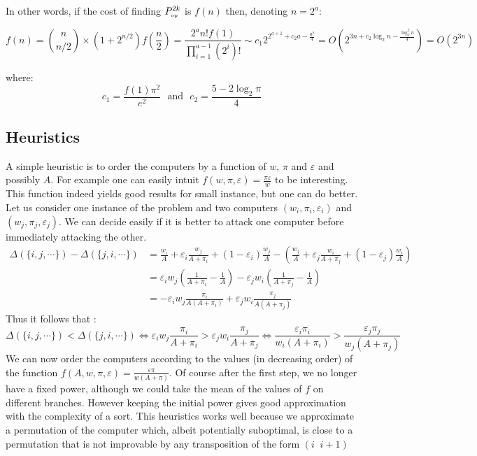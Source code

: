 \documentclass[11pt]{llncs}
\begin{document}
In other words, if the cost of finding $P_{\mbox{{\tiny op}}}^{2k}$ is $f(n)$ then, denoting $n=2^a$:

$$f(n)= \binom{n}{n/2} \times (1+2^{n/2}) f(\frac{n}2)
= \frac{2^a n! f(1)}{\prod_{i=1}^{a-1}(2^i)!} \sim c_1 2^{2^{a+1} + c_2 a - \frac{a^2}4}=
O(2^{3 n + c_2 \log_2 n- \frac{\log_2^2 n}4})=O(2^{3n})$$

where: $$c_1=\frac{f(1)\pi^2}{e^2}\mbox{~~and~~}c_2=\frac{5-2\log_2 \pi}4$$


	\subsection{Heuristics}
		
		A simple heuristic is to order the computers by a function of $w$, $\pi$ and $\varepsilon$ and possibly $A$. For example one can easily intuit $f(w, \pi, \varepsilon) = \frac{\pi\varepsilon}{w}$ to be interesting. This function indeed yields good results for small instance, but one can do better.
		Let us consider one instance of the problem and two computers $(w_i,\pi_i,\varepsilon_i)$ and $(w_j,\pi_j,\varepsilon_j)$. We can decide easily if it is better to attack one computer before immediately attacking the other.
		\begin{align*}
			\Delta( \{ i, j, \cdots \}) - 	\Delta( \{ j, i, \cdots \}) &=  \frac{w_i}{A} + \varepsilon_i \frac{w_j}{A + \pi_i} + (1 - \varepsilon_i) \frac{w_j}{A} - \left ( \frac{w_j}{A} + \varepsilon_j \frac{w_i}{A + \pi_j} + (1 - \varepsilon_j ) \frac{w_i}{A} \right ) \\
										&=   \varepsilon_i w_j \left ( \frac{1}{A + \pi_i} -\frac{1}{A} \right ) - \varepsilon_j w_i \left ( \frac{1}{A + \pi_j} -\frac{1}{A} \right )\\ 
										&= - \varepsilon_i w_j  \frac{\pi_i}{A(A + \pi_i )} + \varepsilon_j w_i  \frac{\pi_j}{A(A + \pi_j )} 
		\end{align*}
		Thus it follows that : \[ \Delta( \{ i, j, \cdots \}) < \Delta( \{ j, i, \cdots \}) \Leftrightarrow \varepsilon_i w_j  \frac{\pi_i}{A + \pi_i} > \varepsilon_j w_i  \frac{\pi_j}{A + \pi_j} \Leftrightarrow \frac{\varepsilon_i \pi_i}{w_i(A + \pi_i)} >  \frac{\varepsilon_j \pi_j}{w_j(A + \pi_j)} \]
		We can now order the computers according to the values (in decreasing order) of the function $f(A,w,\pi, \varepsilon) =\frac{\varepsilon \pi}{w(A + \pi)}$. Of course after the first step, we no longer have a fixed power, although we could take the mean of the values of $f$ on different branches. However keeping the initial power gives good approximation with the complexity of a sort.
		This heuristics works well because we approximate a permutation of the computer which, albeit potentially suboptimal, is close to a permutation that is not improvable by any transposition of the form $(i\;\; i+1)$
		
\end{document}
